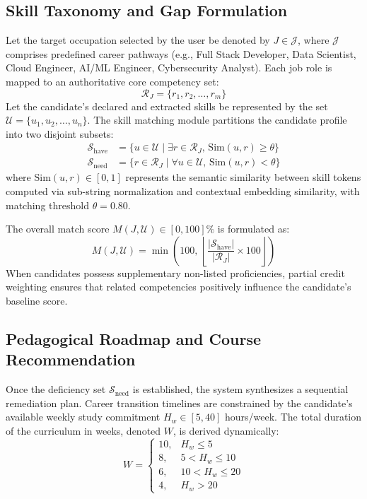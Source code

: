 \documentclass[conference]{IEEEtran}
\begin{document}
\subsection{Skill Taxonomy and Gap Formulation}
Let the target occupation selected by the user be denoted by $J \in \mathcal{J}$, where $\mathcal{J}$ comprises predefined career pathways (e.g., Full Stack Developer, Data Scientist, Cloud Engineer, AI/ML Engineer, Cybersecurity Analyst). Each job role is mapped to an authoritative core competency set:
\begin{equation}
\mathcal{R}_J = \{r_1, r_2, \dots, r_m\}
\end{equation}
Let the candidate's declared and extracted skills be represented by the set $\mathcal{U} = \{u_1, u_2, \dots, u_n\}$. The skill matching module partitions the candidate profile into two disjoint subsets:
\begin{align}
\mathcal{S}_{\text{have}} &= \{u \in \mathcal{U} \mid \exists r \in \mathcal{R}_J, \, \text{Sim}(u, r) \ge \theta \} \\
\mathcal{S}_{\text{need}} &= \{r \in \mathcal{R}_J \mid \forall u \in \mathcal{U}, \, \text{Sim}(u, r) < \theta \}
\end{align}
where $\text{Sim}(u, r) \in [0, 1]$ represents the semantic similarity between skill tokens computed via sub-string normalization and contextual embedding similarity, with matching threshold $\theta = 0.80$.

The overall match score $M(J, \mathcal{U}) \in [0, 100]\%$ is formulated as:
\begin{equation}
M(J, \mathcal{U}) = \min \left( 100, \, \left\lfloor \frac{|\mathcal{S}_{\text{have}}|}{|\mathcal{R}_J|} \times 100 \right\rfloor \right)
\label{eq:match_score}
\end{equation}
When candidates possess supplementary non-listed proficiencies, partial credit weighting ensures that related competencies positively influence the candidate's baseline score.

\subsection{Pedagogical Roadmap and Course Recommendation}
Once the deficiency set $\mathcal{S}_{\text{need}}$ is established, the system synthesizes a sequential remediation plan. Career transition timelines are constrained by the candidate's available weekly study commitment $H_w \in [5, 40]$ hours/week. The total duration of the curriculum in weeks, denoted $W$, is derived dynamically:
\begin{equation}
W = \begin{cases} 
10, & H_w \le 5 \\
8, & 5 < H_w \le 10 \\
6, & 10 < H_w \le 20 \\
4, & H_w > 20
\end{cases}
\end{equation}
\end{document}
